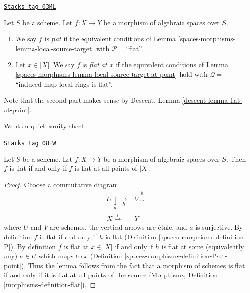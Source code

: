 \begin{definition}[Flat]
\label{spaces-morphisms-definition-flat}
\href{https://stacks.math.columbia.edu/tag/03ML}{\texttt{Stacks tag 03ML}}

Let $S$ be a scheme.
Let $f : X \to Y$ be a morphism of algebraic spaces over $S$.
\begin{enumerate}
\item We say $f$ is {\it flat} if the equivalent conditions of
Lemma \ref{spaces-morphisms-lemma-local-source-target} with
$\mathcal{P} =$``flat''.
\item Let $x \in |X|$. We say $f$ is {\it flat at $x$} if the
equivalent conditions of
Lemma \ref{spaces-morphisms-lemma-local-source-target-at-point}
hold with $\mathcal{Q} =$``induced map local rings is flat''.
\end{enumerate}
Note that the second part makes sense by
Descent, Lemma \ref{descent-lemma-flat-at-point}.
\end{definition}

We do a quick sanity check.

\begin{lemma}
\label{spaces-morphisms-lemma-flat-is-flat-at-all-points}
\href{https://stacks.math.columbia.edu/tag/08EW}{\texttt{Stacks tag 08EW}}

Let $S$ be a scheme. Let $f : X \to Y$ be a morphism of algebraic spaces
over $S$. Then $f$ is flat if and only if $f$ is flat at all points of $|X|$.
\end{lemma}

\begin{proof}
Choose a commutative diagram
$$
\begin{array}{cc}U \underset{a}{\downarrow}\underset{h}{\longrightarrow} & V \overset{b}{\downarrow} \\ X \overset{f}{\longrightarrow} & Y\end{array}
$$
where $U$ and $V$ are schemes, the vertical arrows are \'etale, and
$a$ is surjective. By definition $f$ is flat if and only if $h$ is flat
(Definition \ref{spaces-morphisms-definition-P}).
By definition $f$ is flat at $x \in |X|$ if and only if $h$ is flat
at some (equivalently any) $u \in U$ which maps to $x$
(Definition \ref{spaces-morphisms-definition-P-at-point}).
Thus the lemma follows from the fact that a morphism of schemes
is flat if and only if it is flat at all points of the source
(Morphisms, Definition \ref{morphisms-definition-flat}).
\end{proof}

